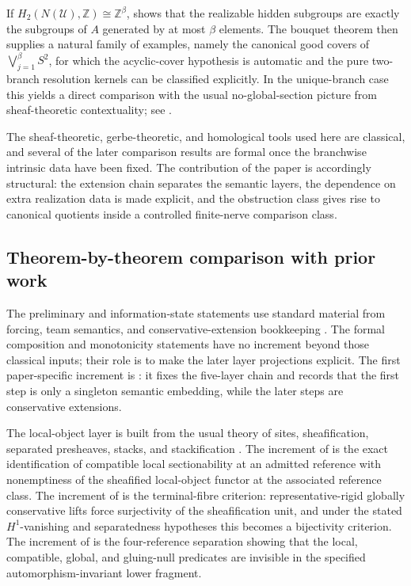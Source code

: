 If $H_2(N(\mathcal U),\mathbb Z)\cong \mathbb Z^\beta$,  shows that the realizable hidden subgroups are exactly the subgroups of $A$ generated by at most $\beta$ elements. The bouquet theorem  then supplies a natural family of examples, namely the canonical good covers of $\bigvee_{j=1}^{\beta}S^2$, for which the acyclic-cover hypothesis is automatic and the pure two-branch resolution kernels can be classified explicitly. In the unique-branch case this yields a direct comparison with the usual no-global-section picture from sheaf-theoretic contextuality; see .

The sheaf-theoretic, gerbe-theoretic, and homological tools used here are classical, and several of the later comparison results are formal once the branchwise intrinsic data have been fixed. The contribution of the paper is accordingly structural: the extension chain separates the semantic layers, the dependence on extra realization data is made explicit, and the obstruction class gives rise to canonical quotients inside a controlled finite-nerve comparison class.

\subsection*{Theorem-by-theorem comparison with prior work}

The preliminary and information-state statements use standard material from forcing, team semantics, and conservative-extension bookkeeping \cite{Kripke1965,Fitting1969,Hodges1997,Vaananen2007}. The formal composition and monotonicity statements have no increment beyond those classical inputs; their role is to make the later layer projections explicit. The first paper-specific increment is : it fixes the five-layer chain and records that the first step is only a singleton semantic embedding, while the later steps are conservative extensions.

The local-object layer is built from the usual theory of sites, sheafification, separated presheaves, stacks, and stackification \cite{MacLaneMoerdijk1994,Johnstone2002,StacksProject}. The increment of  is the exact identification of compatible local sectionability at an admitted reference with nonemptiness of the sheafified local-object functor at the associated reference class. The increment of  is the terminal-fibre criterion: representative-rigid globally conservative lifts force surjectivity of the sheafification unit, and under the stated $H^1$-vanishing and separatedness hypotheses this becomes a bijectivity criterion. The increment of  is the four-reference separation showing that the local, compatible, global, and gluing-null predicates are invisible in the specified automorphism-invariant lower fragment.

